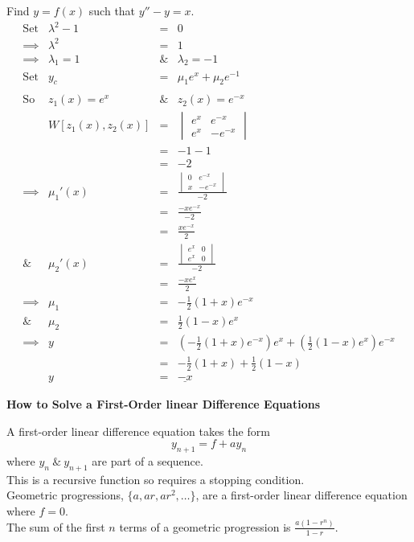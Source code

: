 \documentclass[11pt,a4paper]{article}
\begin{document}
\newpage\subtitle{Example}
Find $y=f(x)$ such that $y''-y=x$.\\
\[\begin{array}{rrcl}
\mathrm{Set}& \lambda^2-1&=&0\\
\implies& \lambda^2 &=&1\\
\implies&\lambda_1 = 1 &\&& \lambda_2 = -1\\
\mathrm{Set}& y_c &=& \mu_1e^x + \mu_2e^{-1}\\
\\\mathrm{So}& z_1(x) = e^x &\&& z_2(x) = e^{-x}\\
&W[z_1(x), z_2(x)] &=& \begin{vmatrix} e^x & e^{-x} \\ e^x & -e^{-x} \end{vmatrix}\\
&&=& -1 - 1\\
&&=& -2\\
\implies& \mu_1'(x) &=& \displaystyle{\frac{\begin{vmatrix}0 & e^{-x} \\ x & -e^{-x} \end{vmatrix}}{-2}}\\
&&=& \displaystyle{\frac{-xe^{-x}}{-2}}\\
&&=& \displaystyle{\frac{xe^{-x}}{2}}\\
\&& \mu_2'(x) &=& \displaystyle{\frac{\begin{vmatrix}e^x & 0 \\ e^x & 0 \end{vmatrix}}{-2}}\\
&&=& \frac{-xe^x}{2}\\
\implies& \mu_1 &=& -\frac{1}{2}(1+x)e^{-x}\\
\&& \mu_2 &=& \frac{1}{2}(1-x)e^x\\
\implies& y &=& (-\frac{1}{2}(1+x)e^{-x})e^x + (\frac{1}{2}(1-x)e^x)e^{-x}\\
&&=& -\frac{1}{2}(1+x) + \frac{1}{2}(1-x)\\
&y &=& \underline{-x}
\end{array}\]

\textbf{How to Solve a First-Order linear Difference Equations}\\

\subtitle{Theory}
A first-order linear difference equation takes the form
$$y_{n+1} = f + ay_n$$
where $y_n\ \&\ y_{n+1}$ are part of a sequence.\\
This is a recursive function so requires a stopping condition.\\
Geometric progressions, $\{a, ar, ar^2, \dots \}$, are a first-order linear difference equation where $f = 0$.\\
The sum of the first $n$ terms of a geometric progression is $\frac{a(1-r^n)}{1-r}$.\\
\end{document}
